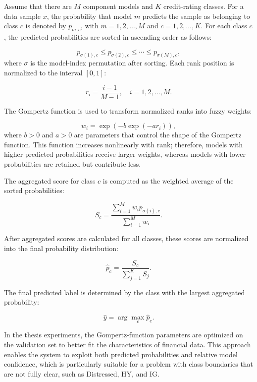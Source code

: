 \documentclass[10pt,twoside]{article}
\begin{document}
Assume that there are $M$ component models and $K$ credit-rating classes. For a data sample $x$, the probability that model $m$ predicts the sample as belonging to class $c$ is denoted by $p_{m,c}$, with $m=1,2,\ldots,M$ and $c=1,2,\ldots,K$. For each class $c$, the predicted probabilities are sorted in ascending order as follows:

\begin{equation}
    p_{\sigma(1),c} \leq p_{\sigma(2),c} \leq \cdots \leq p_{\sigma(M),c},
\end{equation}
where $\sigma$ is the model-index permutation after sorting. Each rank position is normalized to the interval $[0,1]$:

\begin{equation}
    r_i = \frac{i-1}{M-1}, \quad i=1,2,\ldots,M.
\end{equation}

The Gompertz function is used to transform normalized ranks into fuzzy weights:

\begin{equation}
    w_i = \exp\left(-b\exp(-a r_i)\right),
\end{equation}
where $b>0$ and $a>0$ are parameters that control the shape of the Gompertz function. This function increases nonlinearly with rank; therefore, models with higher predicted probabilities receive larger weights, whereas models with lower probabilities are retained but contribute less.

The aggregated score for class $c$ is computed as the weighted average of the sorted probabilities:

\begin{equation}
    S_c = \frac{\sum_{i=1}^{M} w_i p_{\sigma(i),c}}
    {\sum_{i=1}^{M} w_i}.
\end{equation}

After aggregated scores are calculated for all classes, these scores are normalized into the final probability distribution:

\begin{equation}
    \hat{p}_c = \frac{S_c}{\sum_{j=1}^{K} S_j}.
\end{equation}

The final predicted label is determined by the class with the largest aggregated probability:

\begin{equation}
    \hat{y} = \arg\max_c \hat{p}_c.
\end{equation}

In the thesis experiments, the Gompertz-function parameters are optimized on the validation set to better fit the characteristics of financial data. This approach enables the system to exploit both predicted probabilities and relative model confidence, which is particularly suitable for a problem with class boundaries that are not fully clear, such as Distressed, HY, and IG.
\end{document}
